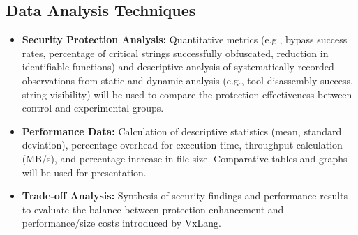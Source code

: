 \subsection{Data Analysis Techniques}
\begin{itemize}
    \item \textbf{Security Protection Analysis:} Quantitative metrics (e.g., bypass success rates, percentage of critical strings successfully obfuscated, reduction in identifiable functions) and descriptive analysis of systematically recorded observations from static and dynamic analysis (e.g., tool disassembly success, string visibility) will be used to compare the protection effectiveness between control and experimental groups.
    \item \textbf{Performance Data:} Calculation of descriptive statistics (mean, standard deviation), percentage overhead for execution time, throughput calculation (MB/s), and percentage increase in file size. Comparative tables and graphs will be used for presentation.
    \item \textbf{Trade-off Analysis:} Synthesis of security findings and performance results to evaluate the balance between protection enhancement and performance/size costs introduced by VxLang.
\end{itemize}

